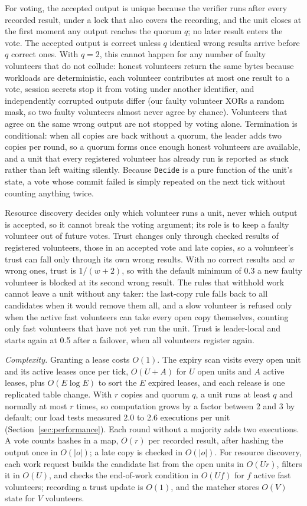 For voting, the accepted output is unique because the verifier runs after every recorded result, under a lock that also covers the recording, and the unit closes at the first moment any output reaches the quorum $q$; no later result enters the vote. The accepted output is correct unless $q$ identical wrong results arrive before $q$ correct ones. With $q = 2$, this cannot happen for any number of faulty volunteers that do not collude: honest volunteers return the same bytes because workloads are deterministic, each volunteer contributes at most one result to a vote, session secrets stop it from voting under another identifier, and independently corrupted outputs differ (our faulty volunteer XORs a random mask, so two faulty volunteers almost never agree by chance). Volunteers that agree on the same wrong output are not stopped by voting alone. Termination is conditional: when all copies are back without a quorum, the leader adds two copies per round, so a quorum forms once enough honest volunteers are available, and a unit that every registered volunteer has already run is reported as stuck rather than left waiting silently. Because \texttt{Decide} is a pure function of the unit's state, a vote whose commit failed is simply repeated on the next tick without counting anything twice.

Resource discovery decides only which volunteer runs a unit, never which output is accepted, so it cannot break the voting argument; its role is to keep a faulty volunteer out of future votes. Trust changes only through checked results of registered volunteers, those in an accepted vote and late copies, so a volunteer's trust can fall only through its own wrong results. With no correct results and $w$ wrong ones, trust is $1/(w+2)$, so with the default minimum of 0.3 a new faulty volunteer is blocked at its second wrong result. The rules that withhold work cannot leave a unit without any taker: the last-copy rule falls back to all candidates when it would remove them all, and a slow volunteer is refused only when the active fast volunteers can take every open copy themselves, counting only fast volunteers that have not yet run the unit. Trust is leader-local and starts again at 0.5 after a failover, when all volunteers register again.

\emph{Complexity.} Granting a lease costs $O(1)$. The expiry scan visits every open unit and its active leases once per tick, $O(U + A)$ for $U$ open units and $A$ active leases, plus $O(E \log E)$ to sort the $E$ expired leases, and each release is one replicated table change. With $r$ copies and quorum $q$, a unit runs at least $q$ and normally at most $r$ times, so computation grows by a factor between 2 and 3 by default; our load tests measured 2.0 to 2.6 executions per unit (Section~\ref{sec:performance}). Each round without a majority adds two executions. A vote counts hashes in a map, $O(r)$ per recorded result, after hashing the output once in $O(|o|)$; a late copy is checked in $O(|o|)$. For resource discovery, each work request builds the candidate list from the open units in $O(Ur)$, filters it in $O(U)$, and checks the end-of-work condition in $O(Uf)$ for $f$ active fast volunteers; recording a trust update is $O(1)$, and the matcher stores $O(V)$ state for $V$ volunteers.


